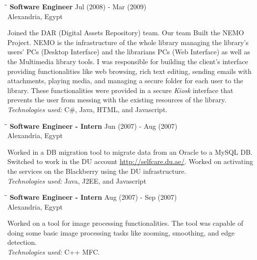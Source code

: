 \documentclass{res}
\begin{document}
\begin{resume}
   \begin{tabbing}
   \hspace{2.3in}\= \hspace{2.3in}\= \kill %
    {\bf Software Engineer}\> \hfill Jul (2008) - Mar (2009)\\
                           \>Alexandria, Egypt
   \end{tabbing}\vspace{-20pt}      %
    Joined the DAR (Digital Assets Repository) team. Our team Built the NEMO Project. NEMO is the infrastructure
    of the whole library managing the library's users’ PCs (Desktop Interface) and the librarians
    PCs (Web Interface) as well as the Multimedia library tools. I was responsible for building the client's interface
    providing functionalities like web browsing, rich text editing, sending emails with attachments, playing media,
    and managing a secure folder for each user to the library. These functionalities were provided in a secure {\sl Kiosk}
    interface that prevents the user from messing with the existing resources of the library.\\
    {\sl Technologies used:} C\#, Java, HTML, and Javascript.

   \begin{tabbing}
   \hspace{2.3in}\= \hspace{2.3in}\= \kill %
    {\bf Software Engineer - Intern}\> \hfill Jun (2007) - Aug (2007)\\
                                    \>Alexandria, Egypt
   \end{tabbing}\vspace{-20pt}      %
    Worked in a DB migration tool to migrate data from an Oracle to a MySQL DB. Switched to work in the DU
    account \url{http://selfcare.du.ae/}. Worked on activating the services on the Blackberry using
    the DU infrastructure.\\
    {\sl Technologies used:} Java, J2EE, and Javascript

   \begin{tabbing}
   \hspace{2.3in}\= \hspace{2.3in}\= \kill %
    {\bf Software Engineer - Intern}\> \hfill Aug (2007) - Sep (2007)\\
                                    \>Alexandria, Egypt
   \end{tabbing}\vspace{-20pt}      %
    Worked on a tool for image processing functionalities. The tool was capable of doing some basic image processing tasks like
    zooming, smoothing, and edge detection.\\
    {\sl Technologies used:} C++ MFC.


\end{resume}
\end{document}
